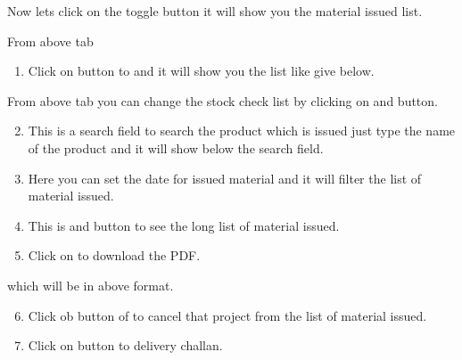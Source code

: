 \documentclass[letterpaper,10pt,english]{sphinxmanual}
\begin{document}
Now lets click on the toggle button it will show you the material issued list.

\begin{figure}[htbp]
\centering

\noindent{}
\end{figure}

From above tab
\begin{enumerate}
\item {} 
Click on  button to and it will show you the list like give below.

\end{enumerate}

\begin{figure}[htbp]
\centering

\noindent{}
\end{figure}

From above tab you can change the stock check list by clicking on  and  button.
\begin{enumerate}
\setcounter{enumi}{1}
\item {} 
This is a search field to search the product which is issued just type the name of the product and it will show below the search field.

\item {} 
Here you can set the date for issued material and it will filter the list of material issued.

\item {} 
This is  and  button to see the long list of material issued.

\item {} 
Click on  to download the PDF.

\end{enumerate}

\begin{figure}[htbp]
\centering

\noindent{}
\end{figure}

which will be in above format.
\begin{enumerate}
\setcounter{enumi}{5}
\item {} 
Click ob  button of to cancel that project from the list of material issued.

\item {} 
Click on  button to  delivery challan.

\end{enumerate}
\end{document}
